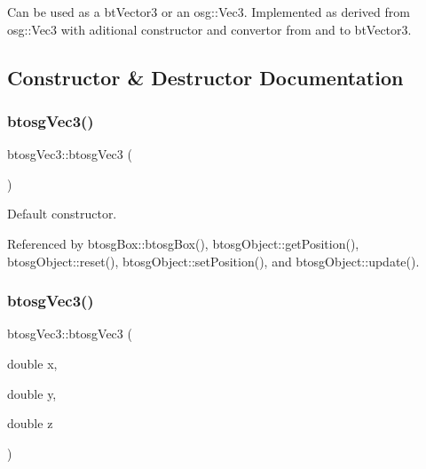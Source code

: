 Can be used as a bt\+Vector3 or an osg\+::\+Vec3. Implemented as derived from osg\+::\+Vec3 with aditional constructor and convertor from and to bt\+Vector3. 

\subsection{Constructor \& Destructor Documentation}
\mbox{\label{classbtosgVec3_a3acd9fe06eeea6dfdec4f7dd6a22abc2}} 
\subsubsection{\texorpdfstring{btosg\+Vec3()}{btosgVec3()}\hspace{0.1cm}{\footnotesize\ttfamily [1/5]}}
{\footnotesize\ttfamily btosg\+Vec3\+::btosg\+Vec3 (\begin{DoxyParamCaption}{ }\end{DoxyParamCaption})\hspace{0.3cm}{\ttfamily [inline]}}



Default constructor. 



Referenced by btosg\+Box\+::btosg\+Box(), btosg\+Object\+::get\+Position(), btosg\+Object\+::reset(), btosg\+Object\+::set\+Position(), and btosg\+Object\+::update().

\mbox{\label{classbtosgVec3_a8bebd055644195494a10937ca754f55b}} 
\subsubsection{\texorpdfstring{btosg\+Vec3()}{btosgVec3()}\hspace{0.1cm}{\footnotesize\ttfamily [2/5]}}
{\footnotesize\ttfamily btosg\+Vec3\+::btosg\+Vec3 (\begin{DoxyParamCaption}\item[{double}]{x,  }\item[{double}]{y,  }\item[{double}]{z }\end{DoxyParamCaption})\hspace{0.3cm}{\ttfamily [inline]}}



